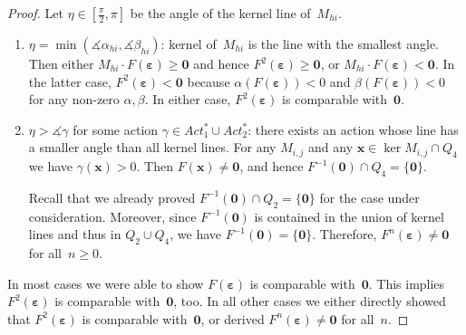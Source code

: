 \documentclass[preprint,12pt]{elsarticle}
\theoremstyle{plain}
\theoremstyle{definition}
\theoremstyle{remark}
\theoremstyle{claimstyle}
\newcommand{\eps}{\bm{\varepsilon}}
\begin{document}
\begin{proof}
		
		Let $\eta \in [\frac{\pi}{2}, \pi]$ be the angle of the kernel line of~$M_{hi}$.
		\begin{enumerate}
			\item $\eta = \min(\measuredangle \alpha_{hi}, \measuredangle \beta_{hi})$: kernel of~$M_{hi}$ is the line with the smallest angle. Then 
			either $M_{hi}\cdot F(\eps) \geq \bm{0}$ and hence $F^2(\eps) \geq \bm{0}$, or $M_{hi} \cdot F(\eps) < \bm{0}$. In the latter case, $F^2(\eps) < \bm{0}$ because $\alpha(F(\eps)) < 0$ and $\beta(F(\eps)) < 0$ for any non-zero $\alpha,\beta$. 
			In either case,	$F^2(\eps)$ is comparable with~$\bm{0}$.
			\item $\eta > \measuredangle\gamma$ for some action $\gamma \in Act_1^* \cup Act_2^*$: there exists an action whose line has a smaller angle than all kernel lines.
		For any $M_{i,j}$ and any $\bm{x} \in \ker M_{i,j} \cap Q_4$ we have $\gamma(\bm{x}) > 0$. Then $F(\bm{x}) \neq \bm{0}$, and hence $F^{-1}(\bm{0}) \cap Q_4 = \{\bm{0}\}$.
			
			Recall that we already proved $F^{-1}(\bm{0}) \cap Q_2 = \{\bm{0}\}$ for the case under consideration.
		Moreover, since $F^{-1}(\bm{0})$ is contained in the union of kernel lines and thus in $Q_2 \cup Q_4$, we have $F^{-1}(\bm{0}) = \{\bm{0}\}$.
		Therefore, $F^n(\eps) \neq \bm{0}$ for all~$n\geq 0$.
		\end{enumerate}
		
		In most cases we were able to show $F(\eps)$ is comparable with~$\bm{0}$. This implies $F^2(\eps)$ is comparable with~$\bm{0}$, too.
		In all other cases we either directly showed that $F^2(\eps)$ is comparable with~$\bm{0}$, or derived $F^n(\eps) \neq \bm{0}$ for all~$n$.
\end{proof}
\end{document}
